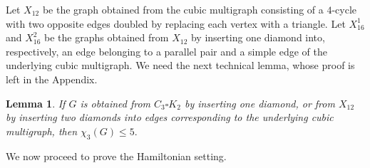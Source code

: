 \documentclass[10pt,a4paper]{article}
\newtheorem{lemma}     	[theorem] {Lemma}
\theoremstyle{case}
\numberwithin{subcase}{case}
\begin{document}
Let $X_{12}$ be the graph obtained from the cubic multigraph consisting
of a $4$-cycle with two opposite edges doubled by replacing each
vertex with a triangle. Let $X_{16}^1$ and $X_{16}^2$ be the graphs
obtained from $X_{12}$ by inserting one diamond into, respectively,
an edge belonging to a parallel pair and a simple edge of the
underlying cubic multigraph.
We need the next technical lemma, whose proof is left in the Appendix.

\begin{lemma}\label{lem:small-diamond-insertions}
If $G$ is obtained from $C_3\square K_2$ by inserting one diamond, or
from $X_{12}$ by inserting two diamonds into edges corresponding to the
underlying cubic multigraph, then
$
\chi_3(G)\leq5.
$
\end{lemma}

We now proceed to prove the Hamiltonian setting.
\end{document}
